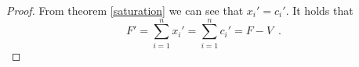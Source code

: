 \begin{proof}
    From theorem \ref{saturation} we can see that $x_i' = c_i'$. It holds that
    \begin{equation*}
       F' = \sum\limits_{i=1}^nx_i' = \sum\limits_{i=1}^nc_i' = F - V \enspace.
    \end{equation*}
\end{proof}
